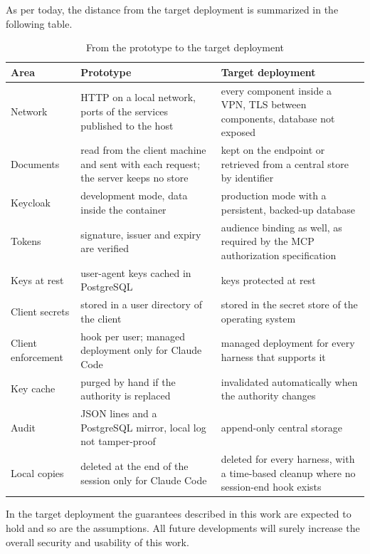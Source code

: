 As per today, the distance from the target deployment is summarized in the following table.
\begin{table}[htbp]
  \centering
  \begingroup\linespread{1.0}\small
  \begin{tabular}{@{}>{\raggedright\arraybackslash}m{}>{\raggedright\arraybackslash}m{}>{\raggedright\arraybackslash}m{}@{}}
    \toprule
    \textbf{Area} & \textbf{Prototype} & \textbf{Target deployment} \\
    \midrule
    Network & HTTP on a local network, ports of the services published to the host & every component inside a VPN, TLS between components, database not exposed \\
    Documents & read from the client machine and sent with each request; the server keeps no store & kept on the endpoint or retrieved from a central store by identifier \\
    Keycloak & development mode, data inside the container & production mode with a persistent, backed-up database \\
    Tokens & signature, issuer and expiry are verified & audience binding as well, as required by the MCP authorization specification \\
    Keys at rest & user-agent keys cached in PostgreSQL & keys protected at rest \\
    Client secrets & stored in a user directory of the client & stored in the secret store of the operating system \\
    Client enforcement & hook per user; managed deployment only for Claude Code & managed deployment for every harness that supports it \\
    Key cache & purged by hand if the authority is replaced & invalidated automatically when the authority changes \\
    Audit & JSON lines and a PostgreSQL mirror, local log not tamper-proof & append-only central storage \\
    Local copies & deleted at the end of the session only for Claude Code & deleted for every harness, with a time-based cleanup where no session-end hook exists \\
    \bottomrule
  \end{tabular}
  \endgroup
  \caption{From the prototype to the target deployment}\label{tab:target}
\end{table}

In the target deployment the guarantees described in this work are expected to hold and so are the assumptions.
All future developments will surely increase the overall security and usability of this work.
